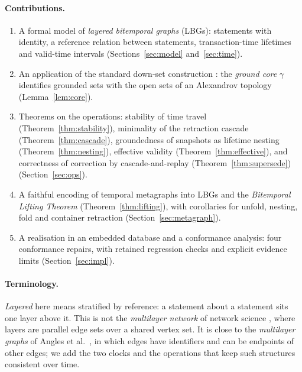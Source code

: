 \documentclass[11pt]{article}
\theoremstyle{plain}
\theoremstyle{definition}
\theoremstyle{remark}
\newcommand{\core}{\gamma}               %
\begin{document}
\paragraph{Contributions.}
\begin{enumerate}
\item A formal model of \emph{layered bitemporal graphs} (LBGs): statements with
  identity, a reference relation between statements, transaction-time lifetimes
  and valid-time intervals (Sections~\ref{sec:model} and~\ref{sec:time}).
\item An application of the standard down-set construction \cite{barmak2011finite}:
  the \emph{ground core} $\core$ identifies grounded sets with the open sets
  of an Alexandrov topology
  (Lemma~\ref{lem:core}).
\item Theorems on the operations: stability of time travel
  (Theorem~\ref{thm:stability}), minimality of the retraction cascade
  (Theorem~\ref{thm:cascade}), groundedness of snapshots as lifetime nesting
  (Theorem~\ref{thm:nesting}), effective validity (Theorem~\ref{thm:effective}),
  and correctness of correction by cascade-and-replay
  (Theorem~\ref{thm:supersede}) (Section~\ref{sec:ops}).
\item A faithful encoding of temporal metagraphs into LBGs and the
  \emph{Bitemporal Lifting Theorem} (Theorem~\ref{thm:lifting}), with corollaries
  for unfold, nesting, fold and container retraction (Section~\ref{sec:metagraph}).
\item A realisation in an embedded database and a conformance analysis: four conformance repairs, with retained regression checks and explicit evidence
  limits
  (Section~\ref{sec:impl}).
\end{enumerate}

\paragraph{Terminology.} \emph{Layered} here means stratified by reference:
a statement about a statement sits one layer above it. This is not the
\emph{multilayer network} of network science \cite{kivela2014multilayer},
where layers are parallel edge sets over a shared vertex set. It is close to the
\emph{multilayer graphs} of Angles et al.\ \cite{angles2022multilayer}, in which
edges have identifiers and can be endpoints of other edges; we add the two clocks
and the operations that keep such structures consistent over time.

\end{document}
